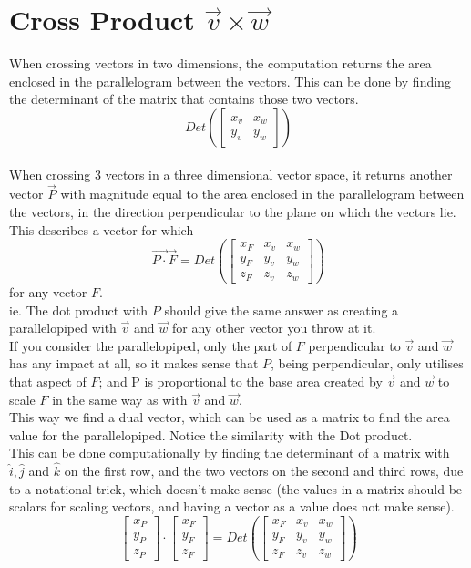 \documentclass{article}
\begin{document}
\section{Cross Product $\vec{v}\times\vec{w}$}
When crossing vectors in two dimensions, the computation returns the area enclosed in the parallelogram between the vectors. This can be done by finding the determinant of the matrix that contains those two vectors.
\[Det\left(\begin{bmatrix}
    x_{v}&x_{w}\\
    y_{v}&y_{w}
\end{bmatrix}\right)
\]
\\ When crossing 3 vectors in a three dimensional vector space, it returns another vector $\vec{P}$ with magnitude equal to the area enclosed in the parallelogram between the vectors, in the direction perpendicular to the plane on which the vectors lie. This describes a vector for which \[\vec{P\cdot}\vec{F} = Det\left(\begin{bmatrix}
    x_{F}&x_{v}&x_{w}\\
    y_{F}&y_{v}&y_{w}\\
    z_{F}&z_{v}&z_{w}
\end{bmatrix}\right)\]
for any vector $F$.\\
ie. The dot product with $P$ should give the same answer as creating a parallelopiped with $\vec{v}$ and $\vec{w}$ for any other vector you throw at it.\\
If you consider the parallelopiped, only the part of $F$ perpendicular to $\vec{v}$ and $\vec{w}$ has any impact at all, so it makes sense that $P$, being perpendicular, only utilises that aspect of $F$; and P is proportional to the base area created by $\vec{v}$ and $\vec{w}$ to scale $F$ in the same way as with $\vec{v}$ and $\vec{w}$.\\
This way we find a dual vector, which can be used as a matrix to find the area value for the parallelopiped. Notice the similarity with the Dot product.\\
This can be done computationally by finding the determinant of a matrix with $\hat{i}, \hat{j}$ and $\hat{k}$ on the first row, and the two vectors on the second and third rows, due to a notational trick, which doesn't make sense (the values in a matrix should be scalars for scaling vectors, and having a vector as a value does not make sense).
\[
\begin{bmatrix}
    x_{P}\\
    y_{P}\\
    z_{P}
\end{bmatrix}\cdot\begin{bmatrix}
    x_{F}\\
    y_{F}\\
    z_{F}
\end{bmatrix} = Det\left(\begin{bmatrix}
    x_{F}&x_{v}&x_{w}\\
    y_{F}&y_{v}&y_{w}\\
    z_{F}&z_{v}&z_{w}
\end{bmatrix}\right)\]
\end{document}
